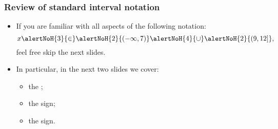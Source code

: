 \begin{frame}
\frametitle{Review of standard interval notation}
\begin{itemize}
\item If you are familiar with all aspects of the following notation:
\[
x\alertNoH{3}{ \in} \alertNoH{2}{ \left( -\infty, 7\right)} \alertNoH{4}{\cup} \alertNoH{2}{ \left(9,12\right]},
\]
feel free skip the next slides. 
\item<2-> In particular, in the next two slides we cover:
\begin{itemize}
\item<2-> the ;
\item<3-> the  sign;
\item<4-> the  sign.
\end{itemize}
\end{itemize}


\end{frame}